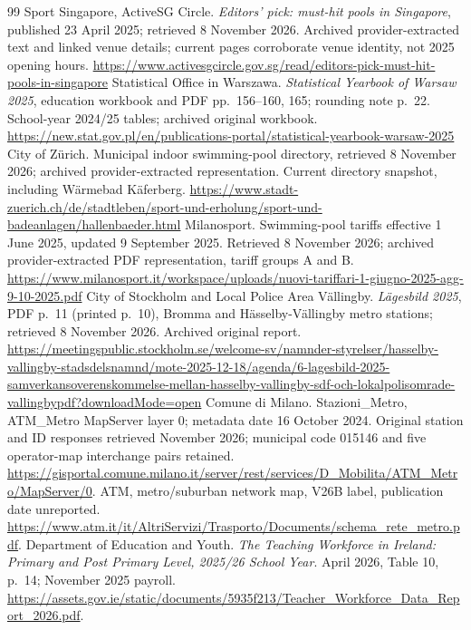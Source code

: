 \begin{thebibliography}{99}
 Sport Singapore, ActiveSG Circle. \textit{Editors' pick:
must-hit pools in Singapore}, published 23 April 2025; retrieved 8 November
2026. Archived provider-extracted text and linked venue details; current
pages corroborate venue identity, not 2025 opening hours.
\url{https://www.activesgcircle.gov.sg/read/editors-pick-must-hit-pools-in-singapore}
 Statistical Office in Warszawa. \textit{Statistical
Yearbook of Warsaw 2025}, education workbook and PDF pp.~156--160, 165;
rounding note p.~22. School-year 2024/25 tables; archived original workbook.
\url{https://new.stat.gov.pl/en/publications-portal/statistical-yearbook-warsaw-2025}
 City of Z\"urich. Municipal indoor swimming-pool directory,
retrieved 8 November 2026; archived provider-extracted representation.
Current directory snapshot, including W\"armebad K\"aferberg.
\url{https://www.stadt-zuerich.ch/de/stadtleben/sport-und-erholung/sport-und-badeanlagen/hallenbaeder.html}
 Milanosport. Swimming-pool tariffs effective 1 June
2025, updated 9 September 2025. Retrieved 8 November 2026; archived
provider-extracted PDF representation, tariff groups A and B.
\url{https://www.milanosport.it/workspace/uploads/nuovi-tariffari-1-giugno-2025-agg-9-10-2025.pdf}
 City of Stockholm and Local Police Area
V\"allingby. \textit{L\"agesbild 2025}, PDF p.~11 (printed p.~10),
Bromma and H\"asselby-V\"allingby metro stations; retrieved 8 November 2026.
Archived original report.
\begingroup\def\UrlBreaks{\do\/\do-\do\?}\url{https://meetingspublic.stockholm.se/welcome-sv/namnder-styrelser/hasselby-vallingby-stadsdelsnamnd/mote-2025-12-18/agenda/6-lagesbild-2025-samverkansoverenskommelse-mellan-hasselby-vallingby-sdf-och-lokalpolisomrade-vallingbypdf?downloadMode=open}\endgroup
{} Comune di Milano. Stazioni\_Metro, ATM\_Metro MapServer layer 0; metadata date 16 October 2024. Original station and ID responses retrieved November 2026; municipal code 015146 and five operator-map interchange pairs retained.
\url{https://gisportal.comune.milano.it/server/rest/services/D_Mobilita/ATM_Metro/MapServer/0}.
ATM, metro/suburban network map, V26B label, publication date unreported.
\url{https://www.atm.it/it/AltriServizi/Trasporto/Documents/schema_rete_metro.pdf}.
 Department of Education and Youth.
\textit{The Teaching Workforce in Ireland: Primary and Post Primary Level,
2025/26 School Year}. April 2026, Table 10, p.~14; November 2025 payroll.
\url{https://assets.gov.ie/static/documents/5935f213/Teacher_Workforce_Data_Report_2026.pdf}.

\end{thebibliography}
